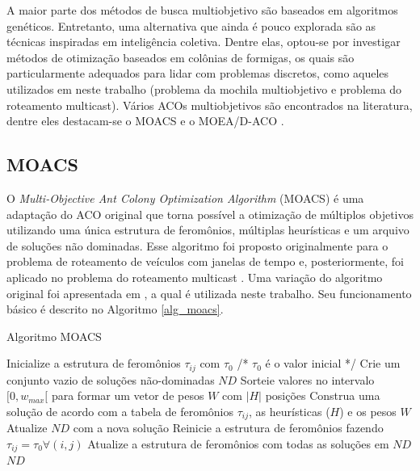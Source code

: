 A maior parte dos métodos de busca multiobjetivo são baseados em algoritmos genéticos. Entretanto, uma alternativa que ainda é pouco explorada são as técnicas inspiradas em inteligência coletiva. Dentre elas, optou-se por investigar métodos de otimização baseados em colônias de formigas, os quais são particularmente adequados para lidar com problemas discretos, como aqueles utilizados em neste trabalho (problema da mochila multiobjetivo e problema do roteamento multicast). Vários ACOs multiobjetivos são encontrados na literatura, dentre eles destacam-se o MOACS \cite{Baran2003} e o MOEA/D-ACO \cite{Ke2013}.

\subsection{MOACS}

O \textit{Multi-Objective Ant Colony Optimization Algorithm} (MOACS) \cite{Baran2003} é uma adaptação do ACO original que torna possível a otimização de múltiplos objetivos utilizando uma única estrutura de feromônios, múltiplas heurísticas e um arquivo de soluções não dominadas. Esse algoritmo foi proposto originalmente para o problema de roteamento de veículos com janelas de tempo e, posteriormente, foi aplicado no problema do roteamento multicast \cite{Pinto2005}. Uma variação do algoritmo original foi apresentada em \cite{Riveros2016}, a qual é utilizada neste trabalho. Seu funcionamento básico é descrito no Algoritmo \ref{alg_moacs}.

\begin{algorithm}
	\caption{Algoritmo MOACS}
	\label{alg_moacs}
	\begin{algorithmic}[1]
		\State Inicialize a estrutura de feromônios $\tau_{ij}$ com $\tau_0$ /* $\tau_{0}$ é o valor inicial */
		\State Crie um conjunto vazio de soluções não-dominadas $ND$
		\State Sorteie valores no intervalo $[0, w_{max}[$ para formar um vetor de pesos $W$ com $|H|$ posições
		\State Construa uma solução de acordo com a tabela de feromônios $\tau_{ij}$, as heurísticas ($H$) e os pesos $W$
		\State Atualize $ND$ com a nova solução
		\EndFor
		\State Reinicie a estrutura de feromônios fazendo $\tau_{ij} = \tau_0 \forall(i,j)$
		\Else
		\State Atualize a estrutura de feromônios com todas as soluções em $ND$
		\EndIf
		\EndWhile
		\State \Return $ND$
	\end{algorithmic}
\end{algorithm}

